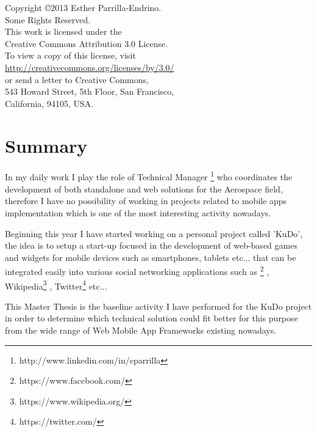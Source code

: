 \documentclass[a4paper,12pt]{book}
\begin{document}
\newpage
\thispagestyle{empty}
\vspace{5cm}
\begin{flushright}
\begin{large}
Copyright \copyright 2013 Esther Parrilla-Endrino.\\
Some Rights Reserved.\\
This work is licensed under the\\
Creative Commons Attribution 3.0 License.\\
To view a copy of this license, visit\\
\url{http://creativecommons.org/licenses/by/3.0/}\\
or send a letter to Creative Commons,\\
543 Howard Street, 5th Floor, San Francisco,\\
California, 94105, USA.\\
\end{large}
\end{flushright}

\newpage

\tableofcontents  %

\renewcommand{\refname}{Bibliography}
\addtolength{\parskip}{\baselineskip}


\chapter*{Summary}
\label{chap:summary}

In my daily work I play the role of Technical Manager \footnote{http://www.linkedin.com/in/eparrilla} who coordinates the development of both standalone and web solutions for the Aerospace field, therefore I have no possibility of working in projects related to mobile apps implementation which is one of the most interesting activity nowadays.

Beginning this year I have started working on a personal project called 'KuDo', the idea is to setup a start-up focused in the development of web-based games and widgets for mobile devices such as smartphones, tablets etc... that can be integrated easily into various social networking applications such as \footnote{https://www.facebook.com/} , Wikipedia\footnote{https://www.wikipedia.org/} , Twitter\footnote{https://twitter.com/}  etc...

This Master Thesis is the baseline activity I have performed for the KuDo project in order to determine which technical solution could fit better for this purpose from the wide range of Web Mobile App Frameworks existing nowadays.
\end{document}
